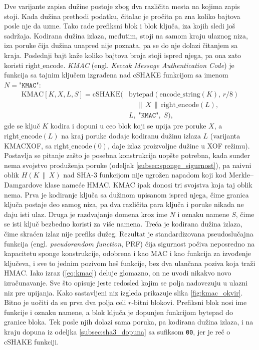 Dve varijante zapisa dužine postoje zbog dva različita mesta na kojima zapis stoji. Kada dužina prethodi podatku, čitalac je pročita pa zna koliko bajtova posle nje da uzme. Tako rade prefiksni blok i blok ključa, iza kojih sledi još sadržaja. Kodirana dužina izlaza, međutim, stoji na samom kraju ulaznog niza, iza poruke čija dužina unapred nije poznata, pa se do nje dolazi čitanjem sa kraja. Poslednji bajt kaže koliko bajtova broja stoji ispred njega, pa ona zato koristi $\mathrm{right\_encode}$.
\smallbreak
\textit{KMAC} (engl. \textit{Keccak Message Authentication Code}) je funkcija sa tajnim ključem izgrađena nad cSHAKE funkcijom sa imenom $N = \texttt{"KMAC"}$:
\begin{align}
    \mathrm{KMAC}[K, X, L, S] = \mathrm{cSHAKE}\big(
        &\mathrm{bytepad}(\mathrm{encode\_string}(K),\, r/8) \nonumber\\
        &\quad {}\,\|\, X \,\|\, \mathrm{right\_encode}(L), \nonumber\\
        &L,\; \texttt{"KMAC"},\; S\big),
    \label{eq:kmac}
\end{align}
gde se ključ $K$ kodira i dopuni u ceo blok koji se upija pre poruke $X$, a $\mathrm{right\_encode}(L)$ na kraj poruke dodaje kodiranu dužinu izlaza $L$ (varijanta KMACXOF, sa $\mathrm{right\_encode}(0)$, daje izlaz proizvoljne dužine u XOF režimu).
\smallbreak
Postavlja se pitanje zašto je posebna konstrukcija uopšte potrebna, kada sunđer nema svojstvo produženja poruke (odeljak \ref{subsec:sponge_sigurnost}), pa naivni oblik $H(K \,\|\, X)$ nad SHA-3 funkcijom nije ugrožen napadom koji kod Merkle--Damgardove klase nameće HMAC. KMAC ipak donosi tri svojstva koja taj oblik nema. Prva je kodiranje ključa sa dužinom upisanom ispred njega, čime granica ključa postaje deo samog niza, pa dva različita para ključa i poruke nikada ne daju isti ulaz. Druga je razdvajanje domena kroz ime $N$ i oznaku namene $S$, čime se isti ključ bezbedno koristi za više namena. Treća je kodirana dužina izlaza, čime skraćen izlaz nije prefiks dužeg. Rezultat je standardizovana pseudoslučajna funkcija (engl. \textit{pseudorandom function}, PRF) čija sigurnost počiva neposredno na kapacitetu sponge konstrukcije, odobrena i kao MAC i kao funkcija za izvođenje ključeva, i sve to jednim pozivom heš funkcije, bez dva ulančana poziva koja traži HMAC.
\smallbreak
Iako izraz (\ref{eq:kmac}) deluje glomazno, on ne uvodi nikakvo novo izračunavanje. Sve što opisuje jeste redosled kojim se polja nadovezuju u ulazni niz pre upijanja. Kako sastavljeni niz izgleda prikazuje slika \ref{fig:kmac_okvir}. Bitno je uočiti da su prva dva polja celi $r$-bitni blokovi. Prefiksni blok nosi ime funkcije i oznaku namene, a blok ključa je dopunjen funkcijom $\mathrm{bytepad}$ do granice bloka. Tek posle njih dolazi sama poruka, pa kodirana dužina izlaza, i na kraju dopuna iz odeljka \ref{subsec:sha3_dopuna} sa sufiksom \texttt{00}, jer je reč o cSHAKE funkciji.

